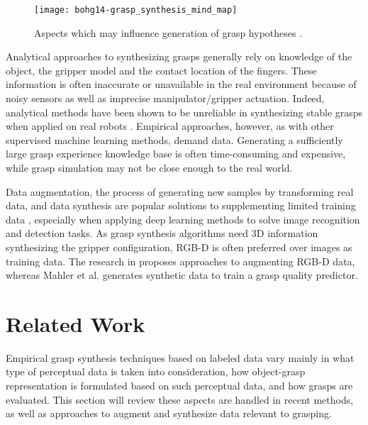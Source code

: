 \begin{figure}[H]
    \centering
    \texttt{[image: bohg14-grasp\_synthesis\_mind\_map]}
    \caption{Aspects which may influence generation of grasp hypotheses \cite{Bohg2014}.}
    \label{fig:grasp_synthesis_mind_map}
\end{figure}

Analytical approaches to synthesizing grasps generally rely on knowledge of the object, the gripper model and the
contact location of the fingers. These information is often inaccurate or unavailable in the real environment
because of noisy sensors as well as imprecise manipulator/gripper actuation. Indeed, analytical methods have been
shown to be unreliable in synthesizing stable grasps when applied on real robots
\cite{Kappler2015, Rubert2017, WeiszAllen2012}. Empirical approaches, however, as with other supervised machine
learning methods, demand data. Generating a sufficiently large grasp experience knowledge base is often time-consuming
and expensive, while grasp simulation may not be close enough to the real world.

Data augmentation, the process of generating new samples by transforming real data, and data synthesis are popular
solutions to supplementing limited training data \cite{Fawzi2016, Shrivastava2017}, especially when applying deep
learning methods to solve image recognition and detection tasks. As grasp synthesis algorithms need 3D information
synthesizing the gripper configuration, RGB-D is often preferred over images as training data. The research in
\cite{Eitel2015,Gupta2014RGBDFeatures} proposes approaches to augmenting RGB-D data, whereas Mahler et al.
\cite{mahler2017} generates synthetic data to train a grasp quality predictor.


\pagebreak
\section{Related Work}
Empirical grasp synthesis techniques based on labeled data vary mainly in what type of perceptual data is taken into
consideration, how object-grasp representation is formulated based on such perceptual data, and how grasps are
evaluated. This section will review these aspects are handled in recent methods, as well as approaches to augment and
synthesize data relevant to grasping.

